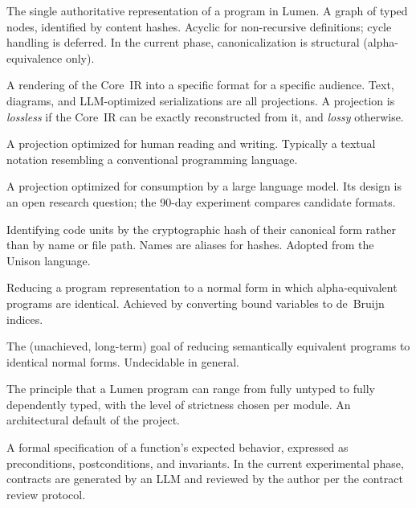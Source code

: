 \documentclass[11pt]{article}
\begin{document}
\begin{description}[style=nextline, leftmargin=3.5cm]
  \item[Canonical Core IR]
    The single authoritative representation of a program in Lumen.
    A graph of typed nodes, identified by content hashes.
    Acyclic for non-recursive definitions; cycle handling is
    deferred.  In the current phase, canonicalization is structural
    (alpha-equivalence only).

  \item[Projection]
    A rendering of the Core~IR into a specific format for a specific
    audience.  Text, diagrams, and LLM-optimized serializations are
    all projections.  A projection is \emph{lossless} if the Core~IR
    can be exactly reconstructed from it, and \emph{lossy} otherwise.

  \item[Human Projection]
    A projection optimized for human reading and writing.  Typically
    a textual notation resembling a conventional programming language.

  \item[LLM Projection]
    A projection optimized for consumption by a large language model.
    Its design is an open research question; the 90-day experiment
    compares candidate formats.

  \item[Content Addressing]
    Identifying code units by the cryptographic hash of their
    canonical form rather than by name or file path.  Names are
    aliases for hashes.  Adopted from the Unison language.

  \item[Structural Canonicalization]
    Reducing a program representation to a normal form in which
    alpha-equivalent programs are identical.  Achieved by converting
    bound variables to de~Bruijn indices.

  \item[Semantic Canonicalization]
    The (unachieved, long-term) goal of reducing semantically
    equivalent programs to identical normal forms.  Undecidable in
    general.

  \item[Staged Strictness]
    The principle that a Lumen program can range from fully untyped
    to fully dependently typed, with the level of strictness chosen
    per module.  An architectural default of the project.

  \item[Contract]
    A formal specification of a function's expected behavior,
    expressed as preconditions, postconditions, and invariants.
    In the current experimental phase, contracts are generated by an
    LLM and reviewed by the author per the contract review protocol.


\end{description}
\end{document}
